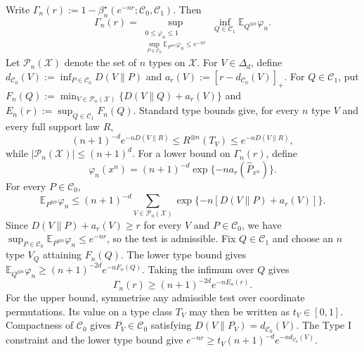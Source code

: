 \documentclass[journal,10pt,draftclsnofoot,onecolumn]{IEEEtran}
\begin{document}
\begin{IEEEproof}
Write
$\Gamma_n(r):=1-\beta_n^\star(e^{-nr};\mathcal C_0,\mathcal C_1)$. Then
\begin{equation}
\Gamma_n(r)
=
\sup_{\substack{
0\leq\varphi_n\leq1\\
\sup_{P\in\mathcal C_0}
\mathbb E_{P^{\otimes n}}\varphi_n
\leq e^{-nr}
}}
\inf_{Q\in\mathcal C_1}
\mathbb E_{Q^{\otimes n}}\varphi_n.
\label{eq:app-strong-converse-gamma}
\end{equation}
Let $\mathcal P_n(\mathcal X)$ denote the set of $n$ types on
$\mathcal X$. For $V\in\Delta_d$, define
$d_{\mathcal C_0}(V):=\inf_{P\in\mathcal C_0}D(V\|P)$ and
$a_r(V):=[r-d_{\mathcal C_0}(V)]_+$. For $Q\in\mathcal C_1$, put
$F_n(Q):=\min_{V\in\mathcal P_n(\mathcal X)}
\{D(V\|Q)+a_r(V)\}$ and
$E_n(r):=\sup_{Q\in\mathcal C_1}F_n(Q)$. Standard type bounds give, for every $n$ type $V$ and every full support
law $R$,
\begin{equation}
(n+1)^{-d}e^{-nD(V\|R)}
\leq
R^{\otimes n}(T_V)
\leq
e^{-nD(V\|R)},
\label{eq:app-type-bounds}
\end{equation}
while $|\mathcal P_n(\mathcal X)|\leq(n+1)^d$. For a lower bound on $\Gamma_n(r)$, define
\begin{equation}
\varphi_n(x^n)
=
(n+1)^{-d}
\exp\{-na_r(\widehat P_{x^n})\}.
\label{eq:app-type-test}
\end{equation}
For every $P\in\mathcal C_0$,
\begin{equation*}
\mathbb E_{P^{\otimes n}}\varphi_n
\leq
(n+1)^{-d}
\sum_{V\in\mathcal P_n(\mathcal X)}
\exp\{-n[D(V\|P)+a_r(V)]\}.
\end{equation*}
Since $D(V\|P)+a_r(V)\geq r$ for every $V$ and $P\in\mathcal C_0$, we have
$\sup_{P\in\mathcal C_0}\mathbb E_{P^{\otimes n}}\varphi_n
\leq e^{-nr}$, so the test is admissible. Fix $Q\in\mathcal C_1$ and choose an $n$ type $V_Q$ attaining
$F_n(Q)$. The lower type bound gives
$\mathbb E_{Q^{\otimes n}}\varphi_n
\geq(n+1)^{-2d}e^{-nF_n(Q)}$. Taking the infimum over $Q$ gives
\begin{equation}
\Gamma_n(r)
\geq
(n+1)^{-2d}e^{-nE_n(r)}.
\label{eq:app-gamma-lower}
\end{equation}
For the upper bound, symmetrise any admissible test over coordinate
permutations. Its value on a type class $T_V$ may then be written as
$t_V\in[0,1]$. Compactness of $\mathcal C_0$ gives
$P_V\in\mathcal C_0$ satisfying
$D(V\|P_V)=d_{\mathcal C_0}(V)$. The Type I constraint and the lower
type bound give
$e^{-nr}\geq t_V(n+1)^{-d}e^{-nd_{\mathcal C_0}(V)}$.

\end{IEEEproof}
\end{document}
